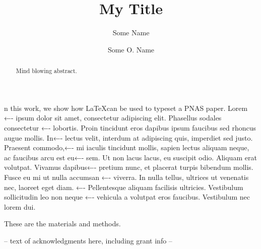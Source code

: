 \documentclass{pnastwo}
\begin{document}
\title{My Title}
\author{Some Name  \and
Some O. Name}
\maketitle
\begin{article}
\begin{abstract}
Mind blowing abstract.
\end{abstract}
n this work, we show how \LaTeX can be used to typeset a PNAS paper. Lorem ←-
ipsum dolor sit amet, consectetur adipiscing elit. Phasellus sodales consectetur ←-
lobortis. Proin tincidunt eros dapibus ipsum faucibus sed rhoncus augue mollis. In←-
lectus velit, interdum at adipiscing quis, imperdiet sed justo. Praesent commodo,←-
mi iaculis tincidunt mollis, sapien lectus aliquam neque, ac faucibus arcu est eu←-
sem. Ut non lacus lacus, eu suscipit odio. Aliquam erat volutpat. Vivamus dapibus←-
pretium nunc, et placerat turpis bibendum mollis. Fusce eu mi ut nulla accumsan ←-
viverra. In nulla tellus, ultrices ut venenatis nec, laoreet eget diam. ←-
Pellentesque aliquam facilisis ultricies. Vestibulum sollicitudin leo non neque ←-
vehicula a volutpat eros faucibus. Vestibulum nec lorem dui.
\begin{materials}
These are the materials and methods.
\end{materials}
\begin{acknowledgments}
-- text of acknowledgments here, including grant info --
\end{acknowledgments}
\end{article}
\end{document}

